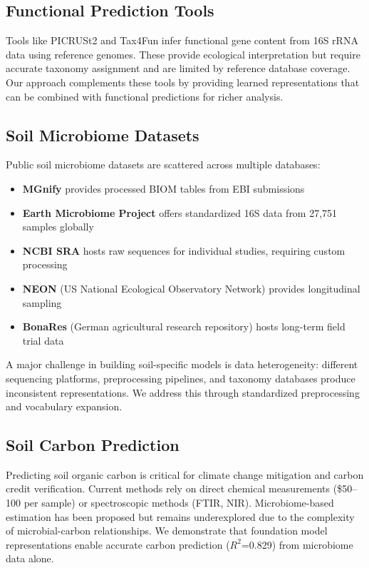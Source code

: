 \documentclass[11pt,a4paper]{article}
\begin{document}
\subsection{Functional Prediction Tools}

Tools like PICRUSt2 \citep{douglas2020picrust2} and Tax4Fun infer functional gene content from 16S rRNA data using reference genomes. These provide ecological interpretation but require accurate taxonomy assignment and are limited by reference database coverage. Our approach complements these tools by providing learned representations that can be combined with functional predictions for richer analysis.

\subsection{Soil Microbiome Datasets}

Public soil microbiome datasets are scattered across multiple databases:

\begin{itemize}[leftmargin=1.5em]
    \item \textbf{MGnify} provides processed BIOM tables from EBI submissions
    \item \textbf{Earth Microbiome Project} \citep{thompson2017communal} offers standardized 16S data from 27,751 samples globally
    \item \textbf{NCBI SRA} hosts raw sequences for individual studies, requiring custom processing
    \item \textbf{NEON} (US National Ecological Observatory Network) provides longitudinal sampling
    \item \textbf{BonaRes} (German agricultural research repository) hosts long-term field trial data
\end{itemize}

A major challenge in building soil-specific models is data heterogeneity: different sequencing platforms, preprocessing pipelines, and taxonomy databases produce inconsistent representations. We address this through standardized preprocessing and vocabulary expansion.

\subsection{Soil Carbon Prediction}

Predicting soil organic carbon is critical for climate change mitigation and carbon credit verification. Current methods rely on direct chemical measurements (\$50--100 per sample) or spectroscopic methods (FTIR, NIR). Microbiome-based estimation has been proposed but remains underexplored due to the complexity of microbial-carbon relationships. We demonstrate that foundation model representations enable accurate carbon prediction ($R^2$=0.829) from microbiome data alone.
\end{document}
